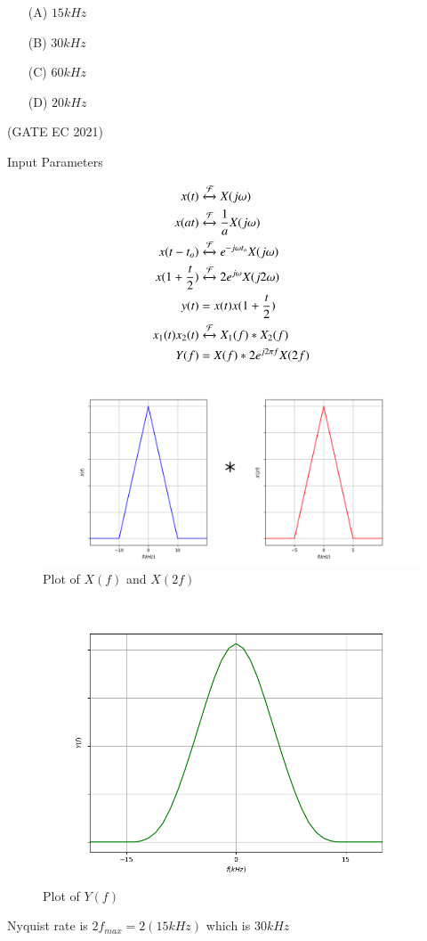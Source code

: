 \documentclass[journal,12pt,twocolumn]{IEEEtran}
\theoremstyle{remark}
\begin{document}
\begin{enumerate}
\item[(A)] $15kHz$
\item[(B)] $30kHz$
\item[(C)] $60kHz$
\item[(D)] $20kHz$
\end{enumerate}
\hfill{(GATE EC 2021)}\\
\solution
\fi
\begin{table}[h!]
\centering

\caption{Input Parameters}
\label{tab:gate2021ec4table}
\end{table}
\begin{align}
x(t) &\xleftrightarrow{\mathcal{F}} X(j\omega)\\
x(at) &\xleftrightarrow{\mathcal{F}} \frac{1}{a}X(j\omega)\\
x(t-t_o) &\xleftrightarrow{\mathcal{F}} e^{-j\omega t_o}X(j\omega)\\
x(1+\frac{t}{2}) &\xleftrightarrow{\mathcal{F}} 2e^{j\omega}X(j2\omega)\\
y(t) &= x(t)x(1+\frac{t}{2})\\
x_1(t)x_2(t) &\xleftrightarrow{\mathcal{F}} X_1(f) * X_2(f)\\
Y(f) &= X(f) * 2e^{j2\pi f}X(2f)
\end{align}
\begin{figure}[h!]
    \centering
    \includegraphics[width=\columnwidth]{2021/EC/4/figs/plot1.png}
    \caption{Plot of $X(f)$ and $X(2f)$}
    \label{fig:gate2021ec4fig1}
\end{figure}
\begin{figure}[h!]
    \centering
    \includegraphics[width=\columnwidth]{2021/EC/4/figs/plot2.png}
    \caption{Plot of $Y(f)$}
    \label{fig:gate2021ec4fig2}
\end{figure}
Nyquist rate is $2f_{max} = 2(15kHz)$ which is $30kHz$
\end{document}
